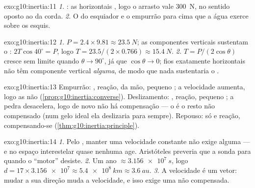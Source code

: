 \begin{solution}{exo:g10:inertia:11}
\emph{1.} : as  horizontais , logo o arrasto vale \qty{300}{N}, no sentido oposto ao da
corda. \emph{2.} O  do esquiador e o empurrão para cima que a água
exerce sobre os esquis.
\end{solution}

\begin{solution}{exo:g10:inertia:12}
\emph{1.} $P = 2.4 \times 9.81 \approx \qty{23.5}{N}$; as componentes
verticais sustentam o : $2T\cos 40^\circ = P$, logo
$T = 23.5/(2 \times 0.766) \approx \qty{15.4}{N}$. \emph{2.}
$T = P/(2\cos\theta)$ cresce sem limite quando $\theta \to 90^\circ$,
já que $\cos\theta \to 0$; fios exatamente horizontais não têm componente
vertical \emph{alguma}, de modo que nada sustentaria o .
\end{solution}

\begin{solution}{exo:g10:inertia:13}
Empurrão: , reação,  da mão, pequeno ; a velocidade
aumenta, logo as  não 
(\cref{prop:g10:inertia:converse}). Deslizamento: , reação, pequeno
; a pedra desacelera, logo de novo não há compensação --- o 
é o resto não compensado (num gelo ideal ela deslizaria para sempre).
Repouso: só  e reação, compensando-se
(\cref{thm:g10:inertia:principle}).
\end{solution}

\begin{solution}{exo:g10:inertia:14}
\emph{1.} Pelo , manter uma velocidade constante não
exige  alguma --- e no espaço interestelar quase nenhuma age.
Aristóteles preveria que a sonda para quando o ``motor'' desiste.
\emph{2.} Um ano $\approx \qty{3.156e7}{s}$, logo
$d = 17 \times \num{3.156e7} \approx \qty{5.4e8}{km} \approx
\qty{3.6}{au}$. \emph{3.} A velocidade é um vetor: mudar a sua direção
muda a velocidade, e isso exige uma  não compensada.
\end{solution}

